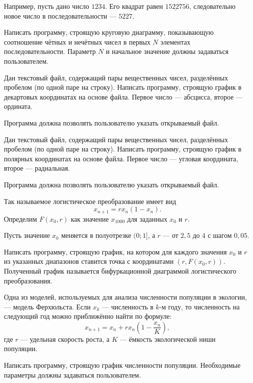 Например, пусть дано число $1234$. Его квадрат равен
$1\underline{5227}56$, следовательно новое число в последовательности
— $5227$.

Написать программу, строящую круговую диаграмму, показывающую
соотношение чётных и нечётных чисел в первых $N$ элементах
последовательности. Параметр $N$ и начальное значение должны
задаваться пользователем.

\task Дан текстовый файл, содержащий пары вещественных чисел,
разделённых пробелом (по одной паре на строку). Написать программу,
строящую график в декартовых координатах на основе файла. Первое число
— абсцисса, второе — ордината.

Программа должна позволять пользователю указать открываемый файл.

\task Дан текстовый файл, содержащий пары вещественных чисел,
разделённых пробелом (по одной паре на строку). Написать программу,
строящую график в полярных координатах на основе файла. Первое число —
угловая координата, второе — радиальная.

Программа должна позволять пользователю указать открываемый файл.

\task Так называемое логистическое
преобразование имеет вид
\[
x_{n+1} = rx_n(1-x_n).
\]
Определим $F(x_0, r)$ как значение $x_{1000}$ для заданных $x_0$ и $r$.

Пусть значение $x_0$ меняется в полуотрезке $(0;1]$, а $r$ — от $2{,}5$
до $4$ с шагом $0{,}05$.

Написать программу, строящую график, на котором для каждого значения
$x_0$ и $r$ из указанных диапазонов ставится точка с координатами
$(r, F(x_0, r))$. Полученный график называется бифуркационной
диаграммой логистического преобразования.

\task Одна из моделей, используемых для анализа численности популяции
в экологии, — модель Ферхюльста. Если $x_k$ —
численность в $k$-м году, то численность на следующий год можно
приближённо найти по формуле:
\[
x_{n+1} = x_n + r x_n \left( 1 - \frac{x_n}K \right),
\]
где $r$ — удельная скорость роста, а $K$ — ёмкость экологической ниши
популяции.

Написать программу, строящую график численности популяции. Необходимые
параметры должны задаваться пользователем.

